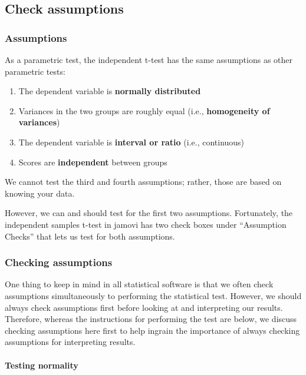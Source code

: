 \documentclass[
]{book}
\begin{document}
\hypertarget{check-assumptions-1}{%
\subsection{Check assumptions}\label{check-assumptions-1}}

\hypertarget{assumptions-1}{%
\subsubsection{Assumptions}\label{assumptions-1}}

As a parametric test, the independent t-test has the same assumptions as other parametric tests:

\begin{enumerate}
\def\labelenumi{\arabic{enumi}.}
\item
  The dependent variable is \textbf{normally distributed}
\item
  Variances in the two groups are roughly equal (i.e., \textbf{homogeneity of variances})
\item
  The dependent variable is \textbf{interval or ratio} (i.e., continuous)
\item
  Scores are \textbf{independent} between groups
\end{enumerate}

We cannot test the third and fourth assumptions; rather, those are based on knowing your data.

However, we can and should test for the first two assumptions. Fortunately, the independent samples t-test in jamovi has two check boxes under ``Assumption Checks'' that lets us test for both assumptions.

\hypertarget{checking-assumptions-2}{%
\subsubsection{Checking assumptions}\label{checking-assumptions-2}}

One thing to keep in mind in all statistical software is that we often check assumptions simultaneously to performing the statistical test. However, we should always check assumptions first before looking at and interpreting our results. Therefore, whereas the instructions for performing the test are below, we discuss checking assumptions here first to help ingrain the importance of always checking assumptions for interpreting results.

\hypertarget{testing-normality-1}{%
\paragraph{Testing normality}\label{testing-normality-1}}
\end{document}
